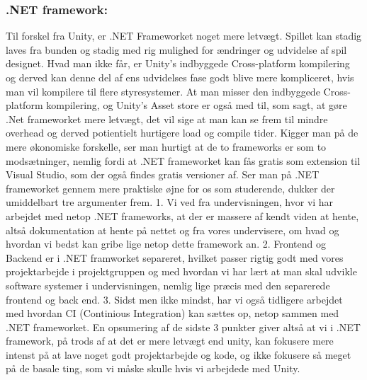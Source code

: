 \subsubsection{.NET framework:}
Til forskel fra Unity, er .NET Frameworket noget mere letvægt. Spillet kan stadig laves fra bunden og stadig med rig mulighed for ændringer og udvidelse af spil designet. Hvad man ikke får, er Unity's indbyggede Cross-platform kompilering og derved kan denne del af ens udvidelses fase godt blive mere kompliceret, hvis man vil kompilere til flere styresystemer. At man misser den indbyggede Cross-platform kompilering, og Unity's Asset store er også med til, som sagt, at gøre .Net frameworket mere letvægt, det vil sige at man kan se frem til mindre overhead og derved potientielt hurtigere load og compile tider.
Kigger man på de mere økonomiske forskelle, ser man hurtigt at de to frameworks er som to modsætninger, nemlig fordi at .NET frameworket kan fås gratis som extension til Visual Studio, som der også findes gratis versioner af.  
Ser man på .NET frameworket gennem mere praktiske øjne for os som studerende, dukker der umiddelbart tre argumenter frem.
1. Vi ved fra undervisningen, hvor vi har arbejdet med netop .NET frameworks, at der er massere af kendt viden at hente, altså dokumentation at hente på nettet og fra vores undervisere, om hvad og hvordan vi bedst kan gribe lige netop dette framework an.
2. Frontend og Backend er i .NET framworket separeret, hvilket passer rigtig godt med vores projektarbejde i projektgruppen og med hvordan vi har lært at man skal udvikle software systemer i undervisningen, nemlig lige præcis med den separerede frontend og back end.
3. Sidst men ikke mindst, har vi også tidligere arbejdet med hvordan CI (Continious Integration) kan sættes op, netop sammen med .NET frameworket.
En opsumering af de sidste 3 punkter giver altså at vi i .NET framework, på trods af at det er mere letvægt end unity, kan fokusere mere intenst på at lave noget godt projektarbejde og kode, og ikke fokusere så meget på de basale ting, som vi måske skulle hvis vi arbejdede med Unity.\cite{Microsoft.com}

